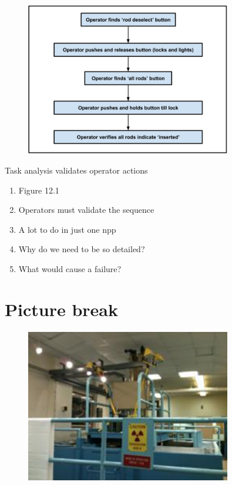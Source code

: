 \documentclass[aspectratio=1610,pdftex,dvipsnames,compress,xcolor={dvipsnames}]{beamer}
\newcommand{\acs}{\acrshort} %
\begin{document}
\begin{frame}{}
    \begin{figure}
        \centering
        \includegraphics[width=0.80\textwidth]{hra_rods.inserted.jpg}
    \end{figure}
\end{frame}


\begin{frame}{Task analysis validates operator actions}
    \begin{enumerate}[series=outerlist,topsep=0pt,itemsep=21pt,leftmargin=*,label=(\arabic*)]
        \item[]Figure 12.1
        \item[]Operators must validate the sequence
        \item[]A lot to do in just one \acs{npp}
        \item[]Why do we need to be so detailed?
        \item[]What would cause a failure?
    \end{enumerate}
\end{frame}


\section{Picture break}


\begin{frame}{}
    \begin{figure}
        \centering
        \includegraphics[width=0.80\textwidth]{wpi.reactor1.jpg}
    \end{figure}
\end{frame}
\end{document}
